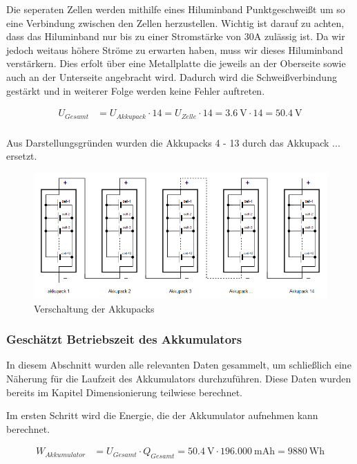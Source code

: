Die seperaten Zellen werden mithilfe eines Hiluminband Punktgeschweißt um so eine Verbindung zwischen den Zellen herzustellen.
Wichtig ist darauf zu achten, dass das Hiluminband nur bis zu einer Stromstärke von 30A zulässig ist. Da wir jedoch weitaus höhere Ströme zu erwarten haben, muss wir dieses Hiluminband verstärkern. Dies erfolt über eine Metallplatte die jeweils an der Oberseite sowie auch an der Unterseite angebracht wird. Dadurch wird die Schweißverbindung gestärkt und in weiterer Folge werden keine Fehler auftreten. 

\begin{align*}
U_{Gesamt} &= U_{Akkupack} \cdot 14= U_{Zelle} \cdot 14= 3.6~\mathrm{V} \cdot 14 = 50.4~\mathrm{V}\\
\end{align*}

Aus Darstellungsgründen wurden die Akkupacks 4 - 13 durch das  Akkupack ... ersetzt.

\begin{figure}[H]
	\begin{center}
		\includegraphics[scale=0.9]{figures/Akku/VerschaltungderAkkupacks.PNG}
		\caption{Verschaltung der Akkupacks}
	\end{center}
\end{figure}
\newpage
\subsubsection{Geschätzt Betriebszeit des Akkumulators}

In diesem Abschnitt wurden alle relevanten Daten gesammelt, um schließlich eine Näherung für die Laufzeit des Akkumulators durchzuführen. Diese Daten wurden bereits im Kapitel Dimensionierung teilwiese berechnet.

Im ersten Schritt wird die Energie, die der Akkumulator aufnehmen kann berechnet.

\begin{align*}
W_{Akkumulator} &= U_{Gesamt} \cdot Q_{Gesamt} = 50.4~\mathrm{V} \cdot 196.000~\mathrm{mAh} = 9880~\mathrm{Wh}\\
\end{align*}

